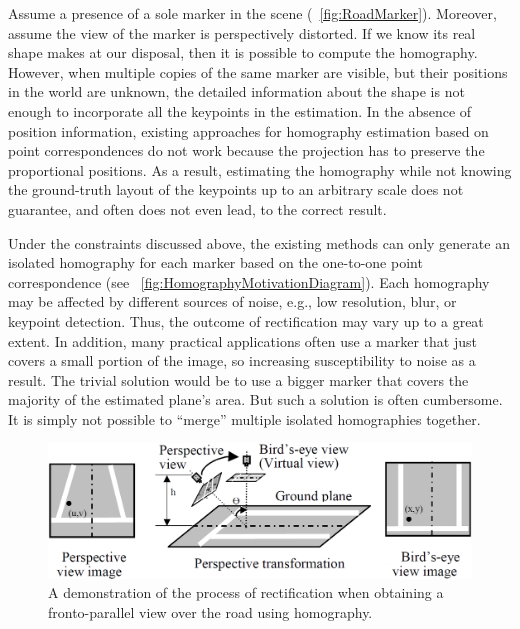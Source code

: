 Assume a presence of a sole marker in the scene (\figstr{}~\ref{fig:RoadMarker}). Moreover, assume the view of the marker is perspectively distorted. If we know its real shape makes at our disposal, then it is possible to compute the homography. However, when multiple copies of the same marker are visible, but their positions in the world are unknown, the detailed information about the shape is not enough to incorporate all the keypoints in the estimation. In the absence of position information, existing approaches for homography estimation based on point correspondences do not work because the projection has to preserve the proportional positions. As a result, estimating the homography while not knowing the ground-truth layout of the keypoints up to an arbitrary scale does not guarantee, and often does not even lead, to the correct result.

Under the constraints discussed above, the existing methods can only generate an isolated homography for each marker based on the one-to-one point correspondence (see \figstr{}~\ref{fig:HomographyMotivationDiagram}). Each homography may be affected by different sources of noise, e.g., low resolution, blur, or keypoint detection. Thus, the outcome of rectification may vary up to a great extent. In addition, many practical applications often use a marker that just covers a small portion of the image, so increasing susceptibility to noise as a result. The trivial solution would be to use a bigger marker that covers the majority of the estimated plane's area. But such a solution is often cumbersome. It is simply not possible to ``merge'' multiple isolated homographies together.

\begin{figure}[t]
  \centerline{\includegraphics[width=0.8\linewidth]{figures/homography/road_rectification.png}}
  \caption[Road rectification]{A demonstration of the process of rectification when obtaining a fronto-parallel view over the road using homography. }
  \label{fig:RoadRectification}
\end{figure}

